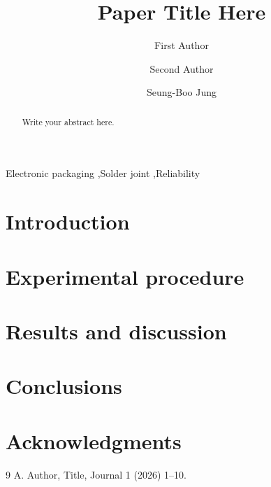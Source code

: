 \documentclass[review]{elsarticle}
\begin{document}
\begin{frontmatter}

\title{Paper Title Here}

\author[skku]{First Author}
\author[skku]{Second Author}
\author[skku]{Seung-Boo Jung}

\begin{abstract}
Write your abstract here.
\end{abstract}

\begin{keyword}
Electronic packaging \sep Solder joint \sep Reliability
\end{keyword}

\end{frontmatter}

\section{Introduction}

\section{Experimental procedure}

\section{Results and discussion}

\section{Conclusions}

\section*{Acknowledgments}

\begin{thebibliography}{9}
 A. Author, Title, Journal 1 (2026) 1--10.
\end{thebibliography}
\end{document}
